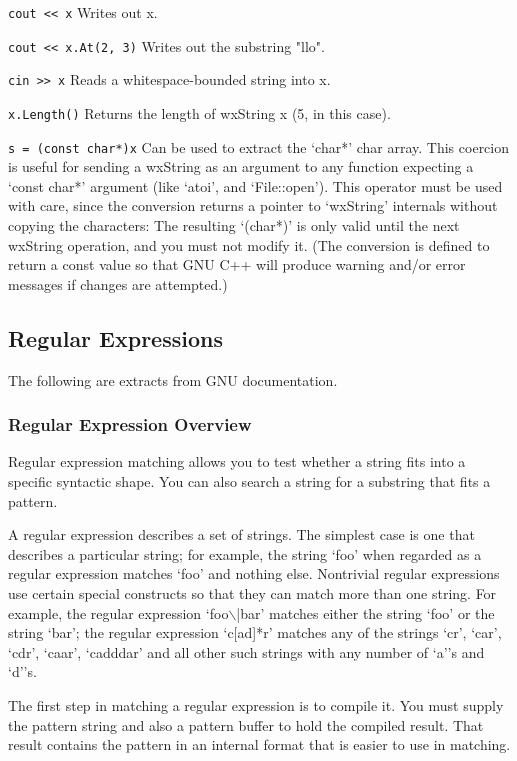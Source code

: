 {\tt cout << x} 
Writes out x.

{\tt cout << x.At(2, 3)} 
Writes out the substring "llo".

{\tt cin >> x} 
Reads a whitespace-bounded string into x.

{\tt x.Length()} 
Returns the length of wxString x (5, in this case).

{\tt s = (const char*)x} 
Can be used to extract the `char*' char array. This coercion is
useful for sending a wxString as an argument to any function
expecting a `const char*' argument (like `atoi', and
`File::open'). This operator must be used with care, since the
conversion returns a pointer to `wxString' internals without copying
the characters: The resulting `(char*)' is only valid until the
next wxString operation,  and you must not modify it.  (The
conversion is defined to return a const value so that GNU C++ will
produce warning and/or error messages if changes are attempted.)

\subsection{Regular Expressions}\label{regularexpressions}

The following are extracts from GNU documentation.

\subsubsection{Regular Expression Overview}

Regular expression matching allows you to test whether a string fits
into a specific syntactic shape. You can also search a string for a
substring that fits a pattern.

A regular expression describes a set of strings. The simplest case
is one that describes a particular string; for example, the string
`foo' when regarded as a regular expression matches `foo' and nothing
else. Nontrivial regular expressions use certain special constructs
so that they can match more than one string. For example, the
regular expression `foo$\backslash$|bar' matches either the string `foo' or the
string `bar'; the regular expression `c[ad]*r' matches any of the
strings `cr', `car', `cdr', `caar', `cadddar' and all other such
strings with any number of `a''s and `d''s.

The first step in matching a regular expression is to compile it. 
You must supply the pattern string and also a pattern buffer to hold
the compiled result. That result contains the pattern in an internal
format that is easier to use in matching.

